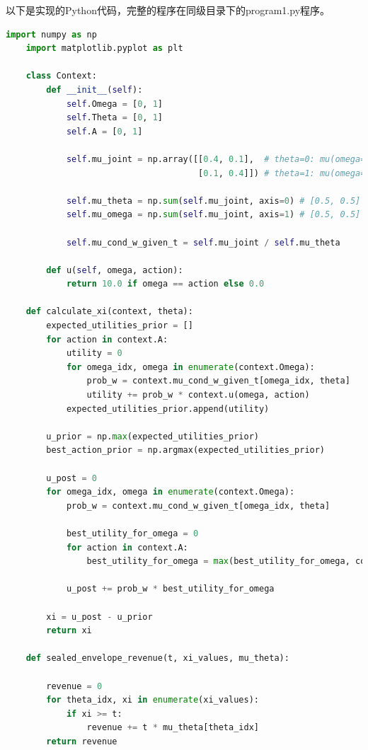 以下是实现的Python代码，完整的程序在同级目录下的program1.py程序。

\begin{lstlisting}[language=Python,style=pythonstyle]
    import numpy as np
    import matplotlib.pyplot as plt
    
    class Context:
        def __init__(self):
            self.Omega = [0, 1]
            self.Theta = [0, 1]
            self.A = [0, 1]
            
            self.mu_joint = np.array([[0.4, 0.1],  # theta=0: mu(omega=0|theta=0)=0.4, mu(omega=1|theta=0)=0.1
                                      [0.1, 0.4]]) # theta=1: mu(omega=0|theta=1)=0.1, mu(omega=1|theta=1)=0.4
            
            self.mu_theta = np.sum(self.mu_joint, axis=0) # [0.5, 0.5]
            self.mu_omega = np.sum(self.mu_joint, axis=1) # [0.5, 0.5]
            
            self.mu_cond_w_given_t = self.mu_joint / self.mu_theta
            
        def u(self, omega, action):
            return 10.0 if omega == action else 0.0
    
    def calculate_xi(context, theta):
        expected_utilities_prior = []
        for action in context.A:
            utility = 0
            for omega_idx, omega in enumerate(context.Omega):
                prob_w = context.mu_cond_w_given_t[omega_idx, theta]
                utility += prob_w * context.u(omega, action)
            expected_utilities_prior.append(utility)
        
        u_prior = np.max(expected_utilities_prior)
        best_action_prior = np.argmax(expected_utilities_prior)
    
        u_post = 0
        for omega_idx, omega in enumerate(context.Omega):
            prob_w = context.mu_cond_w_given_t[omega_idx, theta]

            best_utility_for_omega = 0
            for action in context.A:
                best_utility_for_omega = max(best_utility_for_omega, context.u(omega, action))
            
            u_post += prob_w * best_utility_for_omega
    
        xi = u_post - u_prior
        return xi
    
    def sealed_envelope_revenue(t, xi_values, mu_theta):

        revenue = 0
        for theta_idx, xi in enumerate(xi_values):
            if xi >= t:
                revenue += t * mu_theta[theta_idx]
        return revenue
    

\end{lstlisting}
